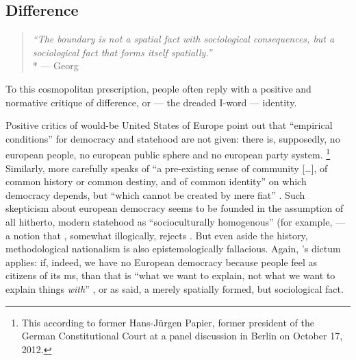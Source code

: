 \subsection[Difference]{Difference} \label{sec:ID-Difference}

\begin{quote}
	\emph{``The boundary is not a spatial fact with sociological consequences, but a sociological fact that forms itself spatially.''}
	\\*
	--- Georg \citet[142]{Simmel1903}
\end{quote}

To this cosmopolitan prescription, people often reply with a positive and normative critique of difference, or --- the dreaded I-word --- identity.

Positive critics of would-be United States of Europe point out that ``empirical conditions'' for democracy and statehood are not given:
there is, supposedly, no european people, no european public sphere and no european party system.
\footnote{
	This according to former Hans-Jürgen Papier, former president of the German Constitutional Court at a panel discussion in Berlin on October 17, 2012.
}
Similarly, \citeauthor{Scharpf1997} more carefully 	speaks of ``a pre-existing sense of community [\ldots], of common history or common destiny, and of common identity'' on which democracy depends, but ``which cannot be created by mere fiat'' \citeyearpar[20]{Scharpf1997}.
Such skepticism about european democracy seems to be founded in the assumption of all hitherto, modern statehood as ``socioculturally homogenous'' (for example, \citealt[93]{BeckGrande-2007-aa} --- a notion that \citeauthor{Scharpf1997}, somewhat illogically, rejects \citeyearpar[20]{Scharpf1997}.
But even aside the history, methodological nationalism is also epistemologically fallacious.
Again, \citeauthor{Brubaker-2002-aa}'s dictum applies:
if, indeed, we have no European democracy because people feel as citizens of its \gls{ms}, than that is ``what we want to explain, not what we want to explain things \emph{with}'' \citeyearpar[165, emphasis in original]{Brubaker-2002-aa}, or as \citeauthor{Simmel1903} said, a merely spatially formed, but sociological fact.

